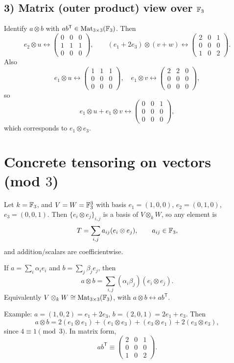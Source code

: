 \documentclass[12pt,a4paper]{article}
\theoremstyle{plain}
\theoremstyle{definition}      %
\begin{document}
\subsection*{3) Matrix (outer product) view over \(\Bbb F_3\)}
Identify \(a\otimes b\) with \(ab^{\mathsf T}\in \mathrm{Mat}_{3\times 3}(\Bbb F_3)\).
Then
\[
e_2\otimes u \leftrightarrow
\begin{pmatrix}
	0&0&0\\
	1&1&1\\
	0&0&0
\end{pmatrix},
\qquad
(e_1+2e_3)\otimes(v+w)\leftrightarrow
\begin{pmatrix}
	2&0&1\\
	0&0&0\\
	1&0&2
\end{pmatrix}.
\]
Also
\[
e_1\otimes u \leftrightarrow
\begin{pmatrix}
	1&1&1\\0&0&0\\0&0&0
\end{pmatrix},\quad
e_1\otimes v \leftrightarrow
\begin{pmatrix}
	2&2&0\\0&0&0\\0&0&0
\end{pmatrix},
\]
so
\[
e_1\otimes u + e_1\otimes v \leftrightarrow
\begin{pmatrix}
	0&0&1\\0&0&0\\0&0&0
\end{pmatrix},
\]
which corresponds to \(e_1\otimes e_3\).



\section*{Concrete tensoring on vectors (mod \(3\))}

Let \(k=\Bbb F_3\), and \(V=W=\Bbb F_3^3\) with basis
\(e_1=(1,0,0)\), \(e_2=(0,1,0)\), \(e_3=(0,0,1)\).
Then \(\{e_i\otimes e_j\}_{i,j}\) is a basis of \(V\otimes_k W\), so any element is
\[
T=\sum_{i,j} a_{ij}(e_i\otimes e_j),\qquad a_{ij}\in \Bbb F_3,
\]
and addition/scalars are coefficientwise.

If \(a=\sum_i \alpha_i e_i\) and \(b=\sum_j \beta_j e_j\), then
\[
a\otimes b=\sum_{i,j} (\alpha_i\beta_j)(e_i\otimes e_j).
\]
Equivalently \(V\otimes_k W\cong \mathrm{Mat}_{3\times 3}(\Bbb F_3)\), with \(a\otimes b\leftrightarrow ab^{\mathsf T}\).

Example: \(a=(1,0,2)=e_1+2e_3\), \(b=(2,0,1)=2e_1+e_3\). Then
\[
a\otimes b
=2(e_1\otimes e_1)+(e_1\otimes e_3)+(e_3\otimes e_1)+2(e_3\otimes e_3),
\]
since \(4\equiv 1\pmod 3\). In matrix form,
\[
ab^{\mathsf T}\equiv
\begin{pmatrix}
	2&0&1\\
	0&0&0\\
	1&0&2
\end{pmatrix}.
\]
	
\end{document}

